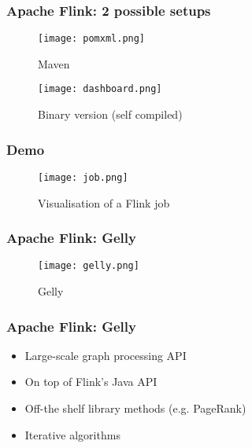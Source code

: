 \begin{frame}
\frametitle{Apache Flink: 2 possible setups}

\begin{minipage}[l]{0.5\textwidth}
\begin{figure}
	\centering
	\texttt{[image: pomxml.png]}
	\caption{Maven}
\end{figure}
\end{minipage}
\begin{minipage}[l]{0.49\textwidth}
\begin{figure}
	\centering
	\texttt{[image: dashboard.png]}
	\caption{Binary version (self compiled)}
\end{figure}
\end{minipage}
\end{frame}

\begin{frame}
\frametitle{Demo}
\begin{figure}
	\centering
	\texttt{[image: job.png]}
	\caption{Visualisation of a Flink job}
\end{figure}
\end{frame}

\begin{frame}
\frametitle{Apache Flink: Gelly}

\begin{figure}
	\centering
	\texttt{[image: gelly.png]}
	\caption{Gelly}
\end{figure}

\end{frame}

\begin{frame}
\frametitle{Apache Flink: Gelly}
\begin{itemize}
\item Large-scale graph processing API
\item On top of Flink's Java API
\item Off-the shelf library methods (e.g. PageRank)
\item Iterative algorithms
\end{itemize}


\end{frame}
